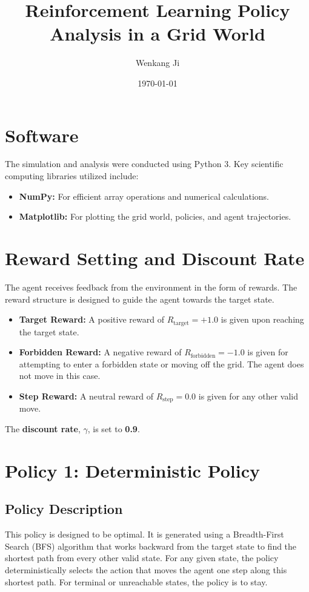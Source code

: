 \documentclass[12pt]{article}
\title{Reinforcement Learning Policy Analysis in a Grid World}
\author{Wenkang Ji}
\date{\today}
\begin{document}
\maketitle

\section{Software}

The simulation and analysis were conducted using Python 3. Key scientific computing libraries utilized include:
\begin{itemize}
    \item \textbf{NumPy:} For efficient array operations and numerical calculations.
    \item \textbf{Matplotlib:} For plotting the grid world, policies, and agent trajectories.
\end{itemize}

\section{Reward Setting and Discount Rate}

The agent receives feedback from the environment in the form of rewards. The reward structure is designed to guide the agent towards the target state.

\begin{itemize}
    \item \textbf{Target Reward:} A positive reward of $R_{\text{target}} = +1.0$ is given upon reaching the target state.
    \item \textbf{Forbidden Reward:} A negative reward of $R_{\text{forbidden}} = -1.0$ is given for attempting to enter a forbidden state or moving off the grid. The agent does not move in this case.
    \item \textbf{Step Reward:} A neutral reward of $R_{\text{step}} = 0.0$ is given for any other valid move.
\end{itemize}

The \textbf{discount rate}, $\gamma$, is set to \textbf{0.9}.

\section{Policy 1: Deterministic Policy}

\subsection{Policy Description}
This policy is designed to be optimal. It is generated using a Breadth-First Search (BFS) algorithm that works backward from the target state to find the shortest path from every other valid state. For any given state, the policy deterministically selects the action that moves the agent one step along this shortest path. For terminal or unreachable states, the policy is to stay.
\end{document}
